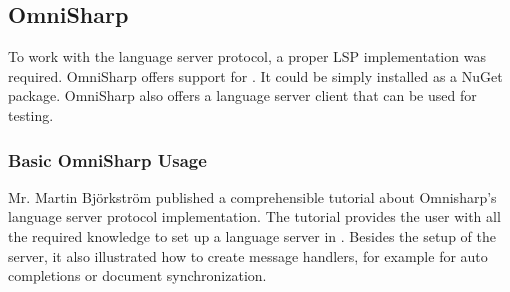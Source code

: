 \subsection{OmniSharp}
\label{section:analysis:omnisharp}
To work with the language server protocol, a proper LSP implementation was required. OmniSharp offers support for \Csharp \cite{langserverdotorg}. It could be simply installed as a NuGet package. OmniSharp also offers a language server client that can be used for testing.

\subsubsection{Basic OmniSharp Usage}
Mr. Martin Björkström published a comprehensible tutorial about Omnisharp's language server protocol implementation. The tutorial provides the user with all the required knowledge to set up a language server in \Csharp. Besides the setup of the server, it also illustrated how to create message handlers, for example for auto completions or document synchronization.

